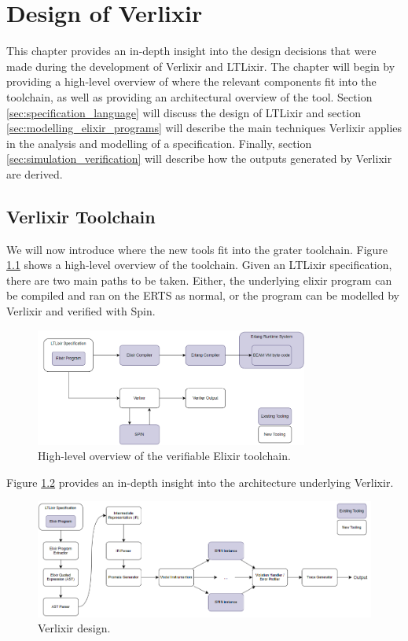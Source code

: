 \chapter{Design of Verlixir} \label{chap:design}
This chapter provides an in-depth insight into the design decisions that were made during the development of Verlixir and LTLixir. The chapter will begin by providing a high-level overview of where the relevant components fit into the toolchain, as well as providing an architectural overview of the tool. Section \ref{sec:specification_language} will discuss the design of LTLixir and section \ref{sec:modelling_elixir_programs} will describe the main techniques Verlixir applies in the analysis and modelling of a specification. Finally, section \ref{sec:simulation_verification} will describe how the outputs generated by Verlixir are derived.  
\section{Verlixir Toolchain} \label{sec:toolchain}
We will now introduce where the new tools fit into the grater toolchain. Figure \ref{fig:high_level} shows a high-level overview of the toolchain. Given an LTLixir specification, there are two main paths to be taken. Either, the underlying elixir program can be compiled and ran on the ERTS as normal, or the program can be modelled by Verlixir and verified with Spin.
\begin{figure}[H]
    \centering
    \includegraphics[width=0.8\textwidth]{images/high_level_system.png}
    \caption{High-level overview of the verifiable Elixir toolchain.}
    \label{fig:high_level}
\end{figure}
Figure \ref{fig:low_level} provides an in-depth insight into the architecture underlying Verlixir.
\begin{figure}[H]
    \centering
    \includegraphics[width=1\textwidth]{images/low_level_system.png}
    \caption{Verlixir design.}
    \label{fig:low_level}
\end{figure}
